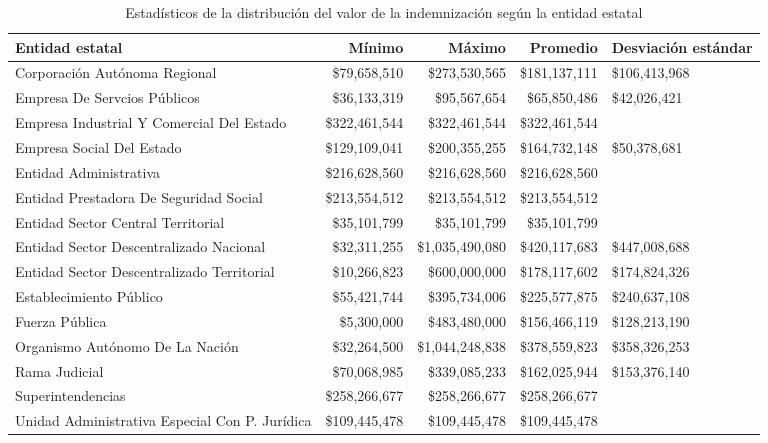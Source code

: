 \begin{sidewaystable}[htbp]
\centering
\caption{Estadísticos de la distribución del
valor de la indemnización según la entidad estatal} 
\label{tab:indemnizacion-entidad}
\begin{tabular}{lrrrR{2cm}}
  \hline
Entidad estatal & Mínimo & Máximo & Promedio & Desviación estándar \\ 
  \hline
Corporación Autónoma Regional & \$79,658,510 & \$273,530,565 & \$181,137,111 & \$106,413,968 \\ 
  Empresa De Servcios Públicos & \$36,133,319 & \$95,567,654 & \$65,850,486 & \$42,026,421 \\ 
  Empresa Industrial Y Comercial Del Estado & \$322,461,544 & \$322,461,544 & \$322,461,544 &  \\ 
  Empresa Social Del Estado & \$129,109,041 & \$200,355,255 & \$164,732,148 & \$50,378,681 \\ 
  Entidad Administrativa & \$216,628,560 & \$216,628,560 & \$216,628,560 &  \\ 
  Entidad Prestadora De Seguridad Social & \$213,554,512 & \$213,554,512 & \$213,554,512 &  \\ 
  Entidad Sector Central Territorial & \$35,101,799 & \$35,101,799 & \$35,101,799 &  \\ 
  Entidad Sector Descentralizado Nacional & \$32,311,255 & \$1,035,490,080 & \$420,117,683 & \$447,008,688 \\ 
  Entidad Sector Descentralizado Territorial & \$10,266,823 & \$600,000,000 & \$178,117,602 & \$174,824,326 \\ 
  Establecimiento Público & \$55,421,744 & \$395,734,006 & \$225,577,875 & \$240,637,108 \\ 
  Fuerza Pública & \$5,300,000 & \$483,480,000 & \$156,466,119 & \$128,213,190 \\ 
  Organismo Autónomo De La Nación & \$32,264,500 & \$1,044,248,838 & \$378,559,823 & \$358,326,253 \\ 
  Rama Judicial & \$70,068,985 & \$339,085,233 & \$162,025,944 & \$153,376,140 \\ 
  Superintendencias & \$258,266,677 & \$258,266,677 & \$258,266,677 &  \\ 
  Unidad Administrativa Especial Con P. Jurídica & \$109,445,478 & \$109,445,478 & \$109,445,478 &  \\ 
   \hline
\end{tabular}
\end{sidewaystable}
